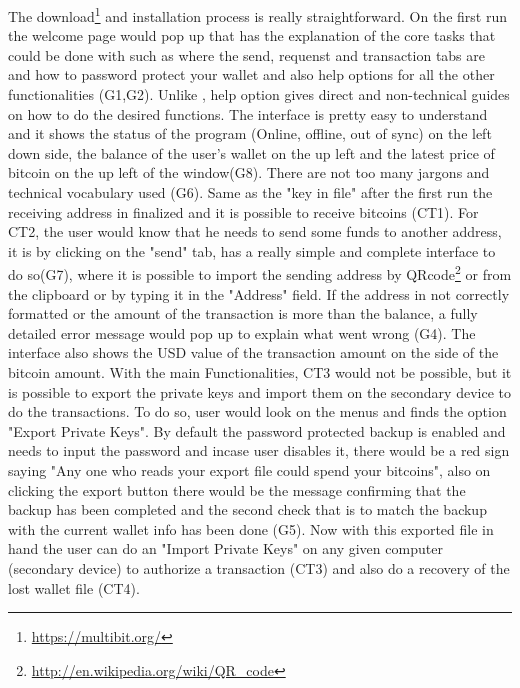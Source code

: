 The download\footnote{\url{https://multibit.org/}} and installation process is really straightforward. On the first run the welcome page would pop up that has the explanation of the core tasks that could be done with \multibit such as where the send, requenst and transaction tabs are and how to password protect your wallet and also help options for all the other functionalities (G1,G2). Unlike \bitcoinclient, \multibit help option gives direct and non-technical guides on how to do the desired functions. The interface is pretty easy to understand and it shows the status of the program (Online, offline, out of sync) on the left down side, the balance of the user's wallet on the up left and the latest price of bitcoin on the up left of the window(G8). There are not too many jargons and technical vocabulary used (G6). Same as the "key in file" after the first run the receiving address in finalized and it is possible to receive bitcoins (CT1). For CT2, the user would know that he needs to send some funds to another address, it is by clicking on the "send" tab, \multibit has a really simple and complete interface to do so(G7), where it is possible to import the sending address by QRcode\footnote{\url{http://en.wikipedia.org/wiki/QR_code}} or from the clipboard or by typing it in the "Address" field. If the address in not correctly formatted or the amount of the transaction is more than the balance, a fully detailed error message would pop up to explain what went wrong (G4). The interface also shows the USD value of the transaction amount on the side of the bitcoin amount. With the main Functionalities, CT3 would not be possible, but it is possible to export the private keys and import them on the secondary device to do the transactions. To do so, user would look on the menus and finds the option "Export Private Keys". By default the password protected backup is enabled and needs to input the password and incase user disables it, there would be a red sign saying "Any one who reads your export file could spend your bitcoins", also on clicking the export button there would be the message confirming that the backup has been completed and the second check that is to match the backup with the current wallet info has been done (G5). Now with this exported file in hand the user can do an "Import Private Keys" on any given computer (secondary device) to authorize a transaction (CT3) and also do a recovery of the lost wallet file (CT4).



